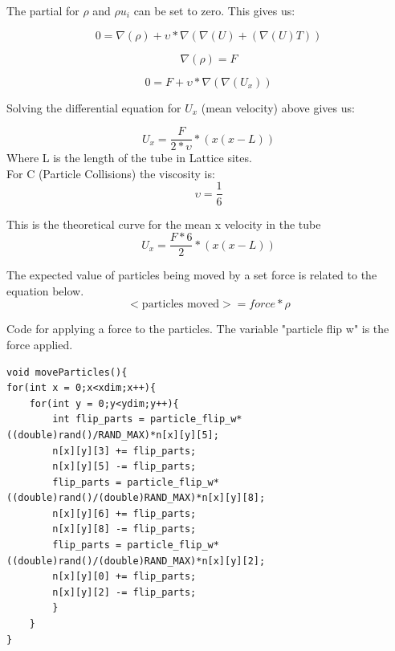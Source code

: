 \documentclass{article}
\begin{document}
The partial for $\rho$ and $\rho u_{i}$ can be set to zero.
This gives us:

\begin{equation}
0 = \nabla(\rho) + \upsilon *\nabla(\nabla(U)+(\nabla(U)T))
\end{equation}

$$ \nabla(\rho) = F$$ 

\begin{equation}
0 = F + \upsilon *\nabla(\nabla(U_x))
\end{equation}

Solving the differential equation for $U_x$ (mean velocity) above gives us:

\begin{equation}
U_x =\frac{F}{2*\upsilon}*(x(x-L))
\end{equation}
\vspace{5mm}
Where L is the length of the tube in Lattice sites.\\
\vspace{5mm}
For C (Particle Collisions) the viscosity is: \\
\begin{equation} 
 \upsilon = \frac{1}{6}
 \end{equation}

This is the theoretical curve for the mean x velocity in the tube
\begin{equation}
U_x =\frac{F*6}{2}*(x(x-L)) 
\end{equation}

\vspace{5mm}
The expected value of particles being moved by a set force is related to the equation below.  
\begin{equation}
<\textrm{particles moved}> = force*\rho
\end{equation}

\vspace{5mm}
Code for applying a force to the particles. The variable "particle flip w" is the force applied.
\begin{verbatim}
void moveParticles(){
for(int x = 0;x<xdim;x++){
	for(int y = 0;y<ydim;y++){
		int flip_parts = particle_flip_w*((double)rand()/RAND_MAX)*n[x][y][5];
		n[x][y][3] += flip_parts;
		n[x][y][5] -= flip_parts;
		flip_parts = particle_flip_w*((double)rand()/(double)RAND_MAX)*n[x][y][8];
		n[x][y][6] += flip_parts;
		n[x][y][8] -= flip_parts;
		flip_parts = particle_flip_w*((double)rand()/(double)RAND_MAX)*n[x][y][2];
		n[x][y][0] += flip_parts;
		n[x][y][2] -= flip_parts;
		}
	}
}
 \end{verbatim}
\vspace{5mm}
\end{document}

